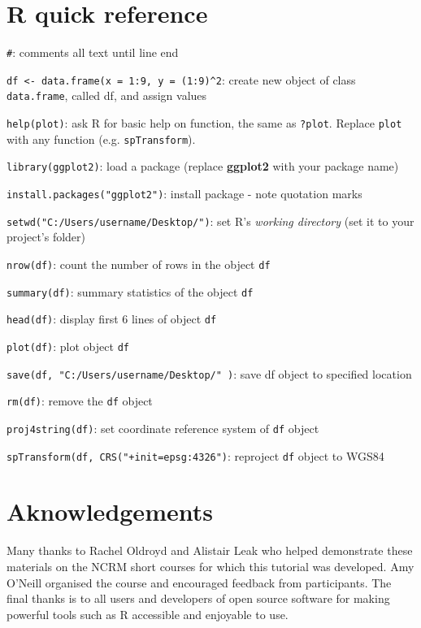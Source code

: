 \documentclass[]{article}
\begin{document}
\section{R quick reference}\label{r-quick-reference}

\texttt{\#}: comments all text until line end

\texttt{df \textless{}- data.frame(x = 1:9, y = (1:9)\^{}2}: create new
object of class \texttt{data.frame}, called df, and assign values

\texttt{help(plot)}: ask R for basic help on function, the same as
\texttt{?plot}. Replace \texttt{plot} with any function (e.g.
\texttt{spTransform}).

\texttt{library(ggplot2)}: load a package (replace \textbf{ggplot2} with
your package name)

\texttt{install.packages("ggplot2")}: install package - note quotation
marks

\texttt{setwd("C:/Users/username/Desktop/")}: set R's \emph{working
directory} (set it to your project's folder)

\texttt{nrow(df)}: count the number of rows in the object \texttt{df}

\texttt{summary(df)}: summary statistics of the object \texttt{df}

\texttt{head(df)}: display first 6 lines of object \texttt{df}

\texttt{plot(df)}: plot object \texttt{df}

\texttt{save(df, "C:/Users/username/Desktop/" )}: save df object to
specified location

\texttt{rm(df)}: remove the \texttt{df} object

\texttt{proj4string(df)}: set coordinate reference system of \texttt{df}
object

\texttt{spTransform(df, CRS("+init=epsg:4326")}: reproject \texttt{df}
object to WGS84

\section{Aknowledgements}\label{aknowledgements}

Many thanks to Rachel Oldroyd and Alistair Leak who helped demonstrate
these materials on the NCRM short courses for which this tutorial was
developed. Amy O'Neill organised the course and encouraged feedback from
participants. The final thanks is to all users and developers of open
source software for making powerful tools such as R accessible and
enjoyable to use.
\end{document}
